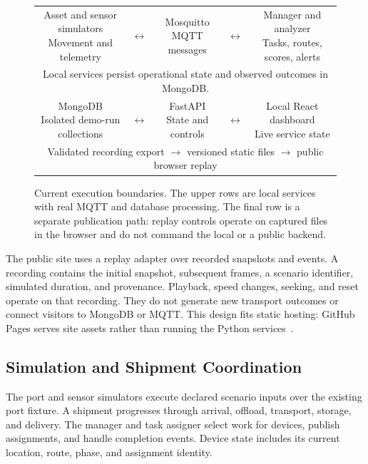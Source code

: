 \documentclass[journal]{IEEEtran}
\newcommand{\component}[2]{\fcolorbox{portblue}{white}{\parbox[c][1.05cm][c]{#1}{\centering\small #2}}}
\begin{document}
\begin{figure}[t]
\centering
\setlength{\tabcolsep}{4pt}
\begin{tabular}{@{}c c c c c@{}}
\component{0.25\textwidth}{Asset and sensor simulators\\Movement and telemetry}
& $\leftrightarrow$ &
\component{0.17\textwidth}{Mosquitto\\MQTT messages}
& $\leftrightarrow$ &
\component{0.25\textwidth}{Manager and analyzer\\Tasks, routes, scores, alerts}
\\[6pt]
\multicolumn{5}{c}{\small Local services persist operational state and observed outcomes in MongoDB.}\\[5pt]
\component{0.25\textwidth}{MongoDB\\Isolated demo-run collections}
& $\leftrightarrow$ &
\component{0.17\textwidth}{FastAPI\\State and controls}
& $\leftrightarrow$ &
\component{0.25\textwidth}{Local React dashboard\\Live service state}
\\[8pt]
\multicolumn{5}{c}{\small Validated recording export $\longrightarrow$ versioned static files $\longrightarrow$ public browser replay}
\end{tabular}
\caption{Current execution boundaries. The upper rows are local services with real MQTT and database processing. The final row is a separate publication path: replay controls operate on captured files in the browser and do not command the local or a public backend.}
\label{fig:architecture}
\end{figure}

The public site uses a replay adapter over recorded snapshots and events. A recording contains the initial snapshot, subsequent frames, a scenario identifier, simulated duration, and provenance. Playback, speed changes, seeking, and reset operate on that recording. They do not generate new transport outcomes or connect visitors to MongoDB or MQTT. This design fits static hosting: GitHub Pages serves site assets rather than running the Python services~\citep{pages}.

\subsection{Simulation and Shipment Coordination}
The port and sensor simulators execute declared scenario inputs over the existing port fixture. A shipment progresses through arrival, offload, transport, storage, and delivery. The manager and task assigner select work for devices, publish assignments, and handle completion events. Device state includes its current location, route, phase, and assignment identity.
\end{document}
